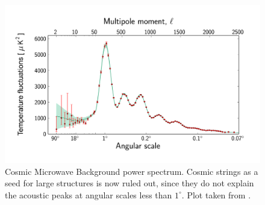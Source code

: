 \begin{figure}
	\centering
	\includegraphics[scale=0.5]{./figures/Planck_Power_Spectrum.jpg}
	\caption{Cosmic Microwave Background power spectrum. Cosmic strings as a seed for large structures is now ruled out, since they do not explain the acoustic peaks at angular scales less than $1^{\circ}$. Plot taken from \cite{powerspec}.}
	\label{fig:powerspec}
\end{figure}



